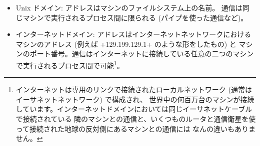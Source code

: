 \begin{itemize}
\item Unix ドメイン:
  アドレスはマシンのファイルシステム上の名前。
  通信は同じマシンで実行されるプロセス間に限られる (パイプを使った通信など)。
%
\item インターネットドメイン:
  アドレスはインターネットネットワークにおけるマシンのアドレス (例えば \ml+129.199.129.1+ のような形をしたもの) と
  マシンのポート番号。通信はインターネットに接続している任意の二つのマシンで実行されるプロセス間で可能\footnote{
    インターネットは専用のリンクで接続されたローカルネットワーク (通常はイーサネットネットワーク) で構成され、
    世界中の何百万台のマシンが接続しています。インターネットドメインにおいては同じイーサネットケーブルで接続されている
    隣のマシンとの通信と、いくつものルータと通信衛星を使って接続された地球の反対側にあるマシンとの通信には
    なんの違いもありません。}。
\end{itemize}

